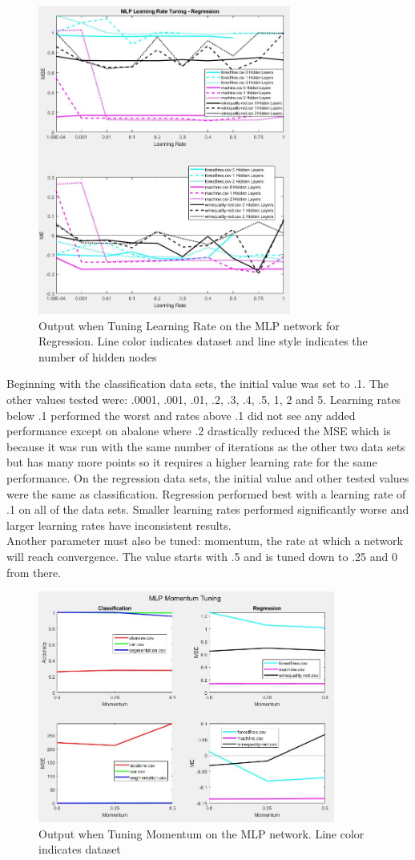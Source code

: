 \documentclass[twoside,11pt]{article}
\begin{document}
\begin{figure}[h]
	\centering
	\includegraphics[height=4in]{FINAL_FIGS/MLP_LR_TUNING_REG.JPG}
	\caption{Output when Tuning Learning Rate on the MLP network for Regression. Line color indicates dataset and line style indicates the number of hidden nodes}
\end{figure}
Beginning with the classification data sets, the initial value was set to .1. The other values tested were: .0001, .001, .01, .2, .3, .4, .5, 1, 2 and 5. Learning rates below .1 performed the worst and rates above .1 did not see any added performance except on abalone where .2 drastically reduced the MSE which is because it was run with the same number of iterations as the other two data sets but has many more points so it requires a higher learning rate for the same performance.
On the regression data sets, the initial value and other tested values were the same as classification. Regression performed best with a learning rate of .1 on all of the data sets. Smaller learning rates performed significantly worse and larger learning rates have inconsistent results. \\
Another parameter must also be tuned: momentum, the rate at which a network will reach convergence. The value starts with .5 and is tuned down to .25 and 0 from there. \\
\begin{figure}[h]
	\centering
	\includegraphics[height=3in]{FINAL_FIGS/MLP_MOMENTUM.JPG}
	\caption{Output when Tuning Momentum on the MLP network. Line color indicates dataset}
\end{figure}
\end{document}
